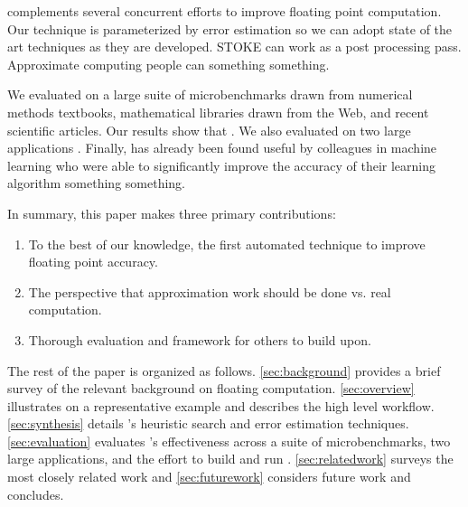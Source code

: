 \documentclass[paper.tex]{subfiles}
\begin{document}
\casio complements several concurrent efforts to improve floating
point computation.  Our technique is parameterized by error estimation
so we can adopt state of the art techniques as they are developed.
STOKE can work as a post processing pass.  Approximate computing
people can something something.

We evaluated \casio on a large suite of microbenchmarks drawn from
numerical methods textbooks, mathematical libraries drawn from the
Web, and recent scientific articles.  Our results show that \casio
{}.  We also evaluated \casio on two large applications
.  Finally, \casio has already been found useful by
colleagues in machine learning who were able to significantly improve
the accuracy of their learning algorithm something something.

In summary, this paper makes three primary contributions:
\begin{enumerate}
\item To the best of our knowledge, the first automated technique to
  improve floating point accuracy.
\item The perspective that approximation work should be done vs. real computation.
\item Thorough evaluation and framework for others to build upon.
\end{enumerate}

The rest of the paper is organized as follows.  \cref{sec:background} provides a brief survey of the relevant background on floating computation.  \cref{sec:overview} illustrates \casio on a representative example and describes the high level \casio workflow.  \cref{sec:synthesis} details \casio's heuristic search and error estimation techniques.  \cref{sec:evaluation} evaluates \casio's effectiveness across a suite of microbenchmarks, two large applications, and the effort to build and run \casio.  \cref{sec:relatedwork} surveys the most closely related work and \cref{sec:futurework} considers future work and concludes.


\end{document}

